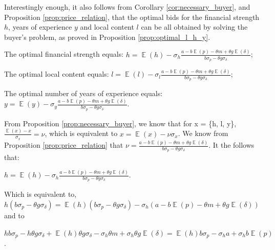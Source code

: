 \documentclass[informs]{informs3}
\begin{document}
Interestingly enough, it also follows from Corollary \ref{cor:necessary_buyer}, and Proposition \ref{prop:price_relation}, that the optimal bids for the financial strength $h$, years of experience $y$ and local content $l$ can be all obtained by solving the buyer's problem, as proved in Proposition \ref{prop:optimal_l_h_y}.



\begin{proposition}\label{prop:optimal_l_h_y}

	
	The optimal financial strength equals: 	
	$h =\mathop{\mathbb{E}}\left(h\right)-  \sigma_{h} \frac{a-b \mathop{\mathbb{E}}\left(p\right)-\theta m+\theta g \mathop{\mathbb{E}}\left(\delta\right)}{b\sigma_{p}-\theta g\sigma_{\delta}}$;
	
	The optimal local content equals: 	
	$l =\mathop{\mathbb{E}}\left(l\right)-  \sigma_{l} \frac{a-b \mathop{\mathbb{E}}\left(p\right)-\theta m+\theta g \mathop{\mathbb{E}}\left(\delta\right)}{b\sigma_{p}-\theta g\sigma_{\delta}}$;

	The optimal number of years of experience equals:	
	$y =\mathop{\mathbb{E}}\left(y\right)-  \sigma_{y} \frac{a-b \mathop{\mathbb{E}}\left(p\right)-\theta m+\theta g \mathop{\mathbb{E}}\left(\delta\right)}{b\sigma_{p}-\theta g\sigma_{\delta}}$.
	
	
\end{proposition}
%
From Proposition \ref{prop:necessary_buyer}, we know that for x = \{h, l, y\},  $\frac{\mathop{\mathbb{E}}\left(x\right)-x}{\sigma_{x}} = \nu$,  which is equivalent to $x =\mathop{\mathbb{E}}\left(x\right)- \nu \sigma_{x}$. We know from Proposition \ref{prop:price_relation} that $\nu =\frac{a-b \mathop{\mathbb{E}}\left(p\right)-\theta m+\theta g \mathop{\mathbb{E}}\left(\delta\right)}{b\sigma_{p}-\theta g\sigma_{\delta}}$. It the follows that:


$h =\mathop{\mathbb{E}}\left(h\right)-  \sigma_{h} \frac{a-b \mathop{\mathbb{E}}\left(p\right)-\theta m+\theta g \mathop{\mathbb{E}}\left(\delta\right)}{b\sigma_{p}-\theta g\sigma_{\delta}}$.

Which is equivalent to, 
$h\left(b\sigma_{p}-\theta g\sigma_{\delta}\right) =\mathop{\mathbb{E}}\left(h\right)\left(b\sigma_{p}-\theta g\sigma_{\delta}\right)-  \sigma_{h} \left(a-b \mathop{\mathbb{E}}\left(p\right)-\theta m+\theta g \mathop{\mathbb{E}}\left(\delta\right)\right)$ and to

$h b\sigma_{p}-h\theta g\sigma_{\delta} +\mathop{\mathbb{E}}\left(h\right)\theta g\sigma_{\delta}
-\sigma_{h}\theta m
+\sigma_{h}\theta g \mathop{\mathbb{E}}\left(\delta\right)=\mathop{\mathbb{E}}\left(h\right)b\sigma_{p}-  \sigma_{h} a+\sigma_{h}b \mathop{\mathbb{E}}\left(p\right)$.
\end{document}
